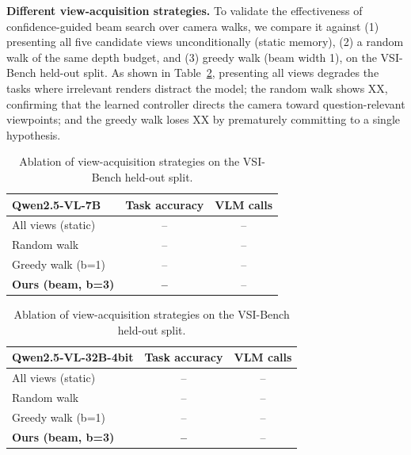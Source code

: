 \noindent\textbf{Different view-acquisition strategies.} To validate the effectiveness of confidence-guided beam search over camera walks, we compare it against (1) presenting all five candidate views unconditionally (static memory), (2) a random walk of the same depth budget, and (3) greedy walk (beam width 1), on the VSI-Bench held-out split. As shown in Table~\ref{tab:vt_keyview_ablation}, presenting all views degrades the tasks where irrelevant renders distract the model; the random walk shows XX, confirming that the learned controller directs the camera toward question-relevant viewpoints; and the greedy walk loses XX by prematurely committing to a single hypothesis.

\begin{table}[h]
	\vspace{0.1in}
	\centering
	\small
	\begin{minipage}[t]{0.48\textwidth}
		\centering
		\begin{tabular}{lcc}
			\toprule
			\textbf{Qwen2.5-VL-7B} & \textbf{Task accuracy} & \textbf{VLM calls} \\ \midrule
			All views (static)          & --            & --              \\
			Random walk                 & --            & --              \\
			Greedy walk (b=1)           & --            & --              \\
			\textbf{Ours (beam, b=3)}   & \textbf{--}   & --              \\ \bottomrule
		\end{tabular}
		\label{tab:vt_ablation_view_7B}
	\end{minipage}
	\hfill
	\begin{minipage}[t]{0.48\textwidth}
		\centering
		\begin{tabular}{lcc}
			\toprule
			\textbf{Qwen2.5-VL-32B-4bit} & \textbf{Task accuracy} & \textbf{VLM calls} \\ \midrule
			All views (static)          & --            & --              \\
			Random walk                 & --            & --              \\
			Greedy walk (b=1)           & --            & --              \\
			\textbf{Ours (beam, b=3)}   & \textbf{--}   & --              \\ \bottomrule
		\end{tabular}
		\label{tab:vt_ablation_view_32B}
	\end{minipage}
	\vspace{0.05in}
	\caption{Ablation of view-acquisition strategies on the VSI-Bench held-out split.}
	\label{tab:vt_keyview_ablation}
	\vspace{-0.15in}
\end{table}

